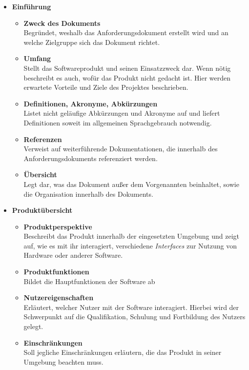 \begin{itemize}
	\item \textbf{Einführung} \citep[vgl.][S. 11 - 12]{ieee1998}
	\begin{itemize}
		\item \textbf{Zweck des Dokuments} \\
		Begründet, weshalb das Anforderungsdokument erstellt wird und an welche Zielgruppe sich das Dokument richtet.
		\item \textbf{Umfang} \\
		Stellt das Softwareprodukt und seinen Einsatzzweck dar. Wenn nötig beschreibt es auch, wofür das Produkt nicht gedacht ist. Hier werden erwartete Vorteile und Ziele des Projektes beschrieben.
		\item \textbf{Definitionen, Akronyme, Abkürzungen} \\
		Listet nicht geläufige Abkürzungen und Akronyme auf und liefert Definitionen soweit im allgemeinen Sprachgebrauch notwendig.
		\item \textbf{Referenzen} \\
		Verweist auf weiterführende Dokumentationen, die innerhalb des Anforderungsdokuments referenziert werden.
		\item \textbf{Übersicht} \\
		Legt dar, was das Dokument außer dem Vorgenannten beinhaltet, sowie die Organisation innerhalb des Dokuments.
	\end{itemize}
	\item \textbf{Produktübersicht} \citep[vgl.][S. 12 - 15]{ieee1998}
	\begin{itemize}
		\item \textbf{Produktperspektive} \\
		Beschreibt das Produkt innerhalb der eingesetzten Umgebung und zeigt auf, wie es mit ihr interagiert, \zb verschiedene \textit{Interfaces} zur Nutzung von Hardware oder anderer Software.
		\item \textbf{Produktfunktionen} \\
		Bildet die Hauptfunktionen der Software ab
		\item \textbf{Nutzereigenschaften} \\
		Erläutert, welcher Nutzer mit der Software interagiert. Hierbei wird der Schwerpunkt auf die Qualifikation, Schulung und Fortbildung des Nutzers gelegt.
		\item \textbf{Einschränkungen} \\
		Soll jegliche Einschränkungen erläutern, die das Produkt in seiner Umgebung beachten muss.

\end{itemize}
\end{itemize}
